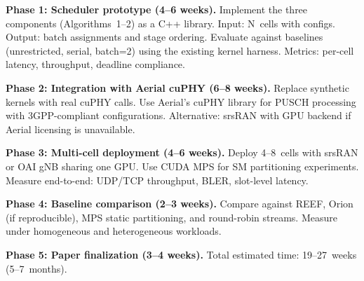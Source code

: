 \textbf{Phase 1: Scheduler prototype (4--6 weeks).} Implement the three components (Algorithms~1--2) as a C++ library. Input: N~cells with configs. Output: batch assignments and stage ordering. Evaluate against baselines (unrestricted, serial, batch=2) using the existing kernel harness. Metrics: per-cell latency, throughput, deadline compliance.

\textbf{Phase 2: Integration with Aerial cuPHY (6--8 weeks).} Replace synthetic kernels with real cuPHY calls. Use Aerial's cuPHY library for PUSCH processing with 3GPP-compliant configurations. Alternative: srsRAN with GPU backend if Aerial licensing is unavailable.

\textbf{Phase 3: Multi-cell deployment (4--6 weeks).} Deploy 4--8~cells with srsRAN or OAI gNB sharing one GPU. Use CUDA MPS for SM partitioning experiments. Measure end-to-end: UDP/TCP throughput, BLER, slot-level latency.

\textbf{Phase 4: Baseline comparison (2--3 weeks).} Compare against REEF, Orion (if reproducible), MPS static partitioning, and round-robin streams. Measure under homogeneous and heterogeneous workloads.

\textbf{Phase 5: Paper finalization (3--4 weeks).} Total estimated time: 19--27~weeks (5--7~months).
